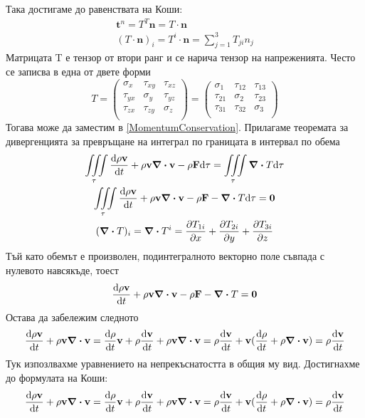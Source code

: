 \documentclass[bulgarian, 12pt]{article}
\begin{document}
Така достигаме до равенствата на Коши:
\begin{gather}
	\mathbf{t}^{n} = T^T \mathbf{n} = T \cdot \mathbf{n} \\
	(T \cdot \mathbf{n})_i = T^i \cdot \mathbf{n} = \sum\limits_{j=1}^3 T_{ji} n_j 
\end{gather}
Матрицата T е тензор от втори ранг и се нарича тензор на напреженията. 
Често се записва в една от двете форми
\begin{equation}
	T = 
		\begin{pmatrix}
			\sigma_x & \tau_{xy} & \tau_{xz} \\
			\tau_{yx} & \sigma_y & \tau_{yz} \\
			\tau_{zx} & \tau_{zy} & \sigma_z \\
		\end{pmatrix} =
		\begin{pmatrix}
			\sigma_1 & \tau_{12} & \tau_{13} \\
			\tau_{21} & \sigma_2 & \tau_{23} \\
			\tau_{31} & \tau_{32} & \sigma_3 \\
		\end{pmatrix}
\end{equation}
Тогава може да заместим в \eqref{MomentumConservation}.
Прилагаме теоремата за дивергенцията за превръщане на интеграл по границата в интервал по обема
\begin{gather}
	\iiint\limits_{\tau} \dv{\rho \mathbf{v}}{t} + \rho \mathbf{v} \div \mathbf{v} - \rho \mathbf{F} \dd \tau = \iiint\limits_{\tau} \div T \dd \tau \\
	\nonumber \iiint\limits_{\tau} \dv{\rho \mathbf{v}}{t} + \rho \mathbf{v} \div \mathbf{v} - \rho \mathbf{F} - \div T \dd \tau = \mathbf{0} \\
	\nonumber (\div T)_i = \div T^i = \pdv{T_{1i}}{x} + \pdv{T_{2i}}{y} + \pdv{T_{3i}}{z}  
\end{gather}
Тъй като обемът е произволен, подинтегралното векторно поле съвпада с нулевото навсякъде, тоест
\begin{equation}
	\dv{\rho \mathbf{v}}{t} + \rho \mathbf{v} \div \mathbf{v} - \rho \mathbf{F} - \div T = \mathbf{0}
\end{equation}
Остава да забележим следното
\begin{equation}
	\dv{\rho \mathbf{v}}{t} + \rho \mathbf{v} \div \mathbf{v} = \dv{\rho}{t} \mathbf{v} + \rho \dv{\mathbf{v}}{t} + \rho \mathbf{v} \div \mathbf{v} = \rho \dv{\mathbf{v}}{t} + \mathbf{v}(\dv{\rho}{t} + \rho \div \mathbf{v}) = \rho \dv{\mathbf{v}}{t}
\end{equation}
Тук изпозлвахме уравнението на непрекъснатостта в общия му вид. Достигнахме до формулата на Коши:
\begin{equation}
	\dv{\rho \mathbf{v}}{t} + \rho \mathbf{v} \div \mathbf{v} = \dv{\rho}{t} \mathbf{v} + \rho \dv{\mathbf{v}}{t} + \rho \mathbf{v} \div \mathbf{v} = \rho \dv{\mathbf{v}}{t} + \mathbf{v}(\dv{\rho}{t} + \rho \div \mathbf{v}) = \rho \dv{\mathbf{v}}{t}
\end{equation}
\end{document}
